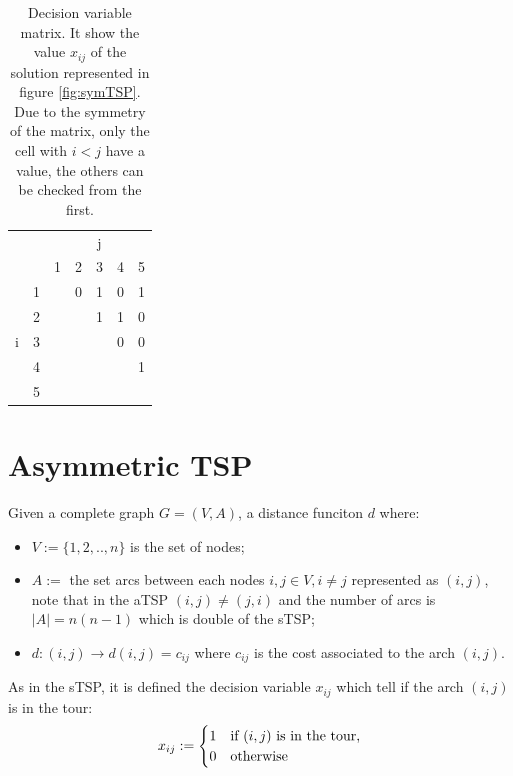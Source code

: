 \begin{table}[h!]
	\begin{center}
		\caption{Decision variable matrix. It show the value $ x_{ij} $ of the solution represented in figure \ref{fig:symTSP}. Due to the symmetry of the matrix, only the cell with $ i < j $ have a value, the others can be checked from the first.}
		\label{tab:symTSP_solution}
		\begin{tabular}{cc|c|c|c|c|c|}
			 \multicolumn{2}{c}{} & \multicolumn{5}{c}{j} \\ %
			& \multicolumn{1}{c}{} & \multicolumn{1}{c}{1} & \multicolumn{1}{c}{2} & \multicolumn{1}{c}{3} & \multicolumn{1}{c}{4} & \multicolumn{1}{c}{5} \\ \cline{3-7}
			\multirow{5}{*}{i} 	& 1 & \cellcolor{Black} & 0 & 1 & 0 & 1 \\ \cline{3-7}
								& 2 &  & \cellcolor{Black} & 1 & 1 & 0 \\ \cline{3-7}
								& 3 &  &  & \cellcolor{Black} & 0 & 0 \\ \cline{3-7}
								& 4 &  &  &  & \cellcolor{Black} & 1 \\ \cline{3-7}
								& 5 &  &  &  &  & \cellcolor{Black} \\ \cline{3-7}
		\end{tabular}
	\end{center}
\end{table}



\section{Asymmetric TSP}
Given a complete graph $ G = (V,A) $, a distance funciton  $ d $ where:
\begin{itemize}
	\item $ V:= \{1, 2, .., n\} $ is the set of nodes;
	\item $ A := $ the set arcs between each nodes $ i,j \in V, i \ne j$ represented as $ (i,j) $, note that in the aTSP $ (i,j) \ne (j,i) $ and the number of arcs is $ |A| = n (n-1) $ which is double of the sTSP;
	\item $ d: (i,j) \rightarrow d(i,j) = c_{ij} $ where $ c_{ij} $ is the cost associated to the arch $ (i,j) $.
\end{itemize}
As in the sTSP, it is defined the decision variable $ x_{ij} $ which tell if the arch $ (i,j) $ is in the tour:
\[
x_{ij} := \begin{cases}
1 & \text{if $ (i,j) $ is in the tour,} \\
0 & \text{otherwise}
\end{cases}
\]

